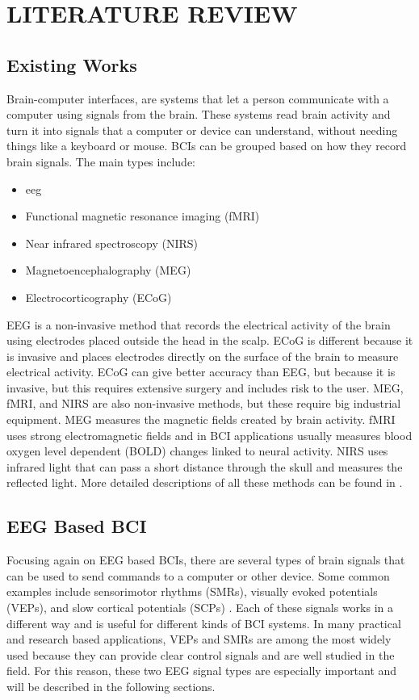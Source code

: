 \chapter{LITERATURE REVIEW}

\section{Existing Works}
Brain-computer interfaces, are systems that let a person communicate with a computer using signals from the brain. These systems read brain activity and turn it into signals that a computer or device can understand, without needing things like a keyboard or mouse. BCIs can be grouped based on how they record brain signals. The main types include:\begin{itemize}
	\item \gls{eeg}
	\item Functional magnetic resonance imaging (fMRI)
	\item Near infrared spectroscopy (NIRS)
	\item Magnetoencephalography (MEG)
	\item Electrocorticography (ECoG)

\end{itemize}

EEG is a non-invasive method that records the electrical activity of the brain using electrodes placed outside the head in the scalp. ECoG is different because it is invasive and places electrodes directly on the surface of the brain to measure electrical activity. ECoG can give better accuracy than EEG, but because it is invasive, but this requires extensive surgery and includes risk to the user. MEG, fMRI, and NIRS are also non-invasive methods, but these require big industrial equipment. MEG measures the magnetic fields created by brain activity. fMRI uses strong electromagnetic fields and in BCI applications usually measures blood oxygen level dependent (BOLD) changes linked to neural activity. NIRS uses infrared light that can pass a short distance through the skull and measures the reflected light. More detailed descriptions of all these methods can be found in \cite{nicolas2012bci}.

\section{EEG Based BCI}
Focusing again on EEG based BCIs, there are several types of brain signals that can be used to send commands to a computer or other device. Some common examples include sensorimotor rhythms (SMRs), visually evoked potentials (VEPs), and slow cortical potentials (SCPs) . Each of these signals works in a different way and is useful for different kinds of BCI systems. In many practical and research based applications, VEPs and SMRs are among the most widely used because they can provide clear control signals and are well studied in the field. For this reason, these two EEG signal types are especially important and will be described in the following sections.

